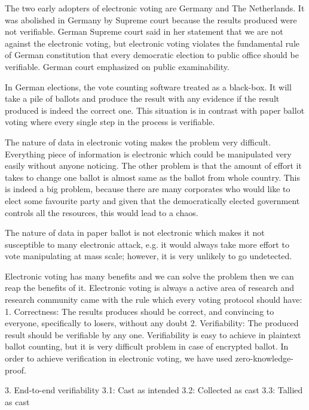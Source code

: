  The two early adopters of electronic voting are Germany and The Netherlands. 
 It was abolished in Germany by Supreme court because the results produced 
 were not verifiable. German Supreme court said in her statement that
 we are not against the electronic voting, but electronic voting violates 
 the fundamental rule of German constitution that every democratic 
 election to public office should be verifiable. German court emphasized on 
 public examinability. 
 
 In German elections, the vote counting software treated as a black-box. It will 
 take a pile of ballots and produce the result with any evidence if the result 
 produced is indeed the correct one. This situation is in contrast with 
 paper ballot voting where every single step in the process is verifiable. 
 
 The nature of data in electronic voting makes the problem very difficult.
 Everything piece of information is electronic which could be manipulated 
 very easily without anyone noticing. The other problem is that
 the amount of effort it takes to change one ballot is almost same as 
 the ballot from whole country.  This is indeed a big problem, because 
 there are many corporates who would like to elect some favourite party 
 and given that the democratically elected government controls all the resources, 
 this would lead to a chaos. 
 
 The nature of data in paper ballot is not electronic which makes it 
 not susceptible to many electronic attack, e.g. it would always take
 more effort to vote manipulating at mass scale; however, it 
 is very unlikely to go undetected. 
 
 
 Electronic voting has many benefits and we can solve the problem
 then we can reap the benefits of it. Electronic voting is always 
 a active area of research and research community came with 
 the rule which every voting protocol should have:
 1. Correctness: The results produces should be correct, and convincing to 
 everyone, specifically to losers, without any doubt
 2. Verifiability: 
   The produced result should be verifiable by any one. Verifiability 
   is easy to achieve in plaintext ballot counting, but it is very difficult problem 
   in case of encrypted ballot. In order to achieve verification in electronic 
   voting, we have used zero-knowledge-proof. 
   
   3. End-to-end verifiability 
  3.1: Cast as intended
  3.2: Collected as cast
  3.3: Tallied as cast
  
